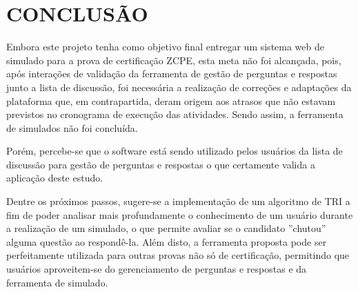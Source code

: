 \chapter{CONCLUSÃO}
\label{chp:conclusao}

Embora este projeto tenha como objetivo final entregar um sistema web de simulado
para a prova de certificação \acs{ZCPE}, esta meta não foi alcançada, pois, 
após interações de validação da ferramenta de gestão de perguntas e
respostas junto a lista de discussão, foi necessária a realização de correções e
adaptações da plataforma que, em contrapartida, deram origem aos atrasos que não
estavam previstos no cronograma de execução das atividades. Sendo assim, a
ferramenta de simulados não foi concluída.

Porém, percebe-se que o software está sendo utilizado pelos usuários da lista
de discussão para gestão de perguntas e respostas o que certamente valida a
aplicação deste estudo.

Dentre os próximos passos, sugere-se a implementação de um algoritmo de \ac{TRI}
a fim de poder analisar mais profundamente o conhecimento de um usuário durante a
realização de um simulado, o que permite avaliar se o candidato ''chutou''
alguma questão ao respondê-la. Além disto, a ferramenta proposta pode ser
perfeitamente utilizada para outras provas não só de certificação, permitindo que usuários
aproveitem-se do gerenciamento de perguntas e respostas e da ferramenta de
simulado.